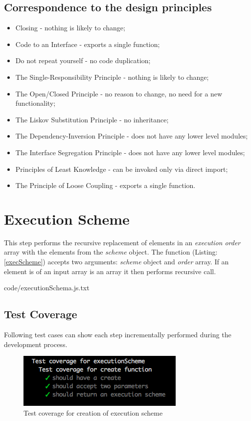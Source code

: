 \subsection{Correspondence to  the design principles}
\begin{itemize}
	\item Closing - nothing is likely to change;
	\item Code to an Interface - exports a single function;
	\item Do not repeat yourself - no code duplication;
	\item The Single-Responsibility Principle - nothing is likely to change;
	\item The Open/Closed Principle - no reason to change, no need for a new functionality;
	\item The Liskov Substitution Principle - no inheritance;
	\item The Dependency-Inversion Principle - does not have any lower level modules;
	\item The Interface Segregation Principle - does not have any lower level modules;
	\item Principles of Least Knowledge -  can be invoked only via direct import;
	\item The Principle of Loose Coupling - exports a single function.
\end{itemize}

\section{Execution Scheme}
\label{sec:execScheme}
This step performs the recursive replacement of elements in an \textit{execution order} array with the elements from the \textit{scheme} object. The function (Listing: \ref{execScheme}) accepts two arguments: \textit{scheme} object and \textit{order} array. If an element is of an input array is an array it then performs recursive call.


{code/executionSchema.js.txt}
\subsection{Test Coverage}
Following test cases can show each step incrementally performed during the development process.
\begin{figure}[H]
	\centering
	\includegraphics[width=\linewidth]{grafiken/testCreate.png}
	\caption{Test coverage for creation of execution scheme}
	\label{fig:testCreate}
\end{figure}

